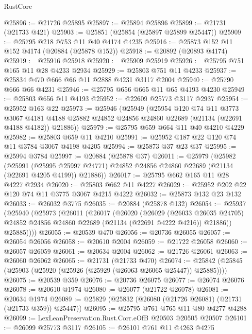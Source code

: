 \begin{lexlean}{RustCore}
\begin{coremodule}
@25896 := @21726 @25895
@25897 := @25894 @25896
@25899 := @21731 (@21733 @421)
@25903 := @25851 (@25854 (@25897 @25899 @25447))
@25909 := @25795 @218 @753 @11 @40 @4174 @4235
@25916 := @25873 @152 @11 @152 @4174 (@20884 (@25878 @152))
@25918 := @20892 (@20893 @4174)
@25919 := @25916 @25918
@25920 := @25909 @25919
@25926 := @25795 @751 @165 @11 @28 @4233 @2934
@25929 := @25803 @751 @11 @4233
@25937 := @25834 @470 @666 @66 @11 @2888 @4231 @3117 @2004
@25940 := @25790 @666 @66 @4231
@25946 := @25795 @656 @665 @11 @65 @4193 @4230
@25949 := @25803 @656 @11 @4193
@25952 := @22609 @25773 @3117 @2937
@25954 := @25952 @163 @22
@25973 := @25946
    (@25949
      (@25954
        @120
        @74
        @11
        @3773
        @3067
        @4181
        @4188
        @25882
        @24852
        @24856
        @24860
        @22689
        (@21134 (@22691 @4188 @4182))
        @21886))
@25979 := @25795 @659 @664 @11 @40 @4210 @4229
@25982 := @25803 @659 @11 @4210
@25991 := @25952 @187 @22 @120 @74 @11 @3784 @3067 @4198 @4205
@25994 := @25873 @37 @23 @37
@25995 := @25994 @3784
@25997 := @20884 (@25878 @37)
@26011 := @25979
    (@25982
      (@25991
        (@25995 @25997 @24771)
        @24852
        @24856
        @24860
        @22689
        (@21134 (@22691 @4205 @4199))
        @21886))
@26017 := @25795 @662 @165 @11 @28 @4227 @2934
@26020 := @25803 @662 @11 @4227
@26029 := @25952 @202 @22 @120 @74 @11 @3775 @3067 @4215 @4222
@26032 := @25873 @132 @23 @132
@26033 := @26032 @3775
@26035 := @20884 (@25878 @132)
@26054 := @25937
    (@25940
      (@25973
        (@26011
          (@26017
            (@26020
              (@26029
                (@26033 @26035 @24705)
                @24852
                @24856
                @24860
                @22689
                (@21134 (@22691 @4222 @4216))
                @21886))
            @25885))))
@26055 := @20539 @470
@26056 := @20736 @26055
@26057 := @26054 @26056
@26058 := @20610 @2004
@26059 := @21722 @26058
@26060 := @26057 @26059
@26061 := @20634 @2004
@26062 := @21726 @26061
@26063 := @26060 @26062
@26065 := @21731 (@21733 @470)
@26074 := @25842 (@25845 (@25903 (@25920 (@25926 (@25929 (@26063 @26065 @25447)) @25885))))
@26075 := @20539 @359
@26076 := @20736 @26075
@26077 := @26074 @26076
@26078 := @20610 @1974
@26080 := @26077 (@21722 @26078)
@26081 := @20634 @1974
@26089 := @25829 (@25832 (@26080 (@21726 @26081) (@21731 (@21733 @359)) @25447))
@26095 := @25795 @761 @765 @11 @80 @4277 @4288
@26099 := LexLeanPreservation.Rust.Corr.eOfB @20503 @20505 @20507
@26101 := @26099 @25773 @3117
@26105 := @26101 @761 @11 @4263 @4275

\end{coremodule}
\end{lexlean}
